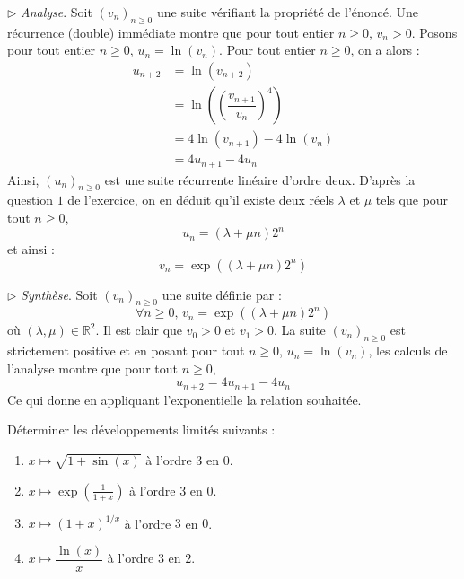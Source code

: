 \documentclass[a4paper,10pt]{report}
\begin{document}
\noindent $\rhd$ \textit{Analyse}. Soit $(v_n)_{n \geq 0}$ une suite vérifiant la propriété de l'énoncé. Une récurrence (double) immédiate montre que pour tout entier $n \geq 0$, $v_n>0$. Posons pour tout entier $n \geq 0$, $u_n = \ln(v_n)$. Pour tout entier $n \geq 0$, on a alors :
\begin{align*}
u_{n+2} & = \ln(v_{n+2}) \\
& = \ln \left(\left(\dfrac{v_{n+1}}{v_n}\right)^4\right) \\
& = 4 \ln(v_{n+1}) - 4 \ln(v_n) \\
& = 4 u_{n+1} - 4 u_n 
\end{align*}
Ainsi, $(u_n)_{n \geq 0}$ est une suite récurrente linéaire d'ordre deux. D'après la question $1$ de l'exercice, on en déduit qu'il existe deux réels $\lambda$ et $\mu$ tels que pour tout $n \geq 0$,
$$ u_n = (\lambda+\mu n)2^n$$
et ainsi :
$$ v_n = \exp((\lambda+ \mu n)2^n)$$

\medskip

\noindent $\rhd$ \textit{Synthèse}. Soit $(v_n)_{n \geq 0}$ une suite définie par :
$$ \forall n \geq 0, \, v_n = \exp((\lambda+ \mu n)2^n)$$
où $(\lambda, \mu) \in \mathbb{R}^2$. Il est clair que $v_0>0$ et $v_1>0$. La suite $(v_n)_{n \geq 0}$ est strictement positive et en posant pour tout $n \geq 0$, $u_n = \ln(v_n)$, les calculs de l'analyse montre que pour tout $n \geq 0$,
$$ u_{n+2} = 4u_{n+1}- 4u_n$$
Ce qui donne en appliquant l'exponentielle la relation souhaitée.

\medskip

%
%
%
%
%

\begin{Exercice}{}
Déterminer les développements limités suivants :

\begin{multicols}{2}
\begin{enumerate}
\item $x \mapsto \sqrt{1+\sin(x)}$ à l'ordre $3$ en $0$.
\item $x \mapsto \exp \left( \frac{1}{1+x}\right)$ à l'ordre $3$ en $0$.
\item $x \mapsto (1+x)^{1/x}$ à l'ordre $3$ en $0$.
\item $x \mapsto \dfrac{\ln(x)}{x}$ à l'ordre $3$ en $2$.
\end{enumerate}
\end{multicols}

\vspace{0.1cm}
\end{Exercice} 
\end{document}
